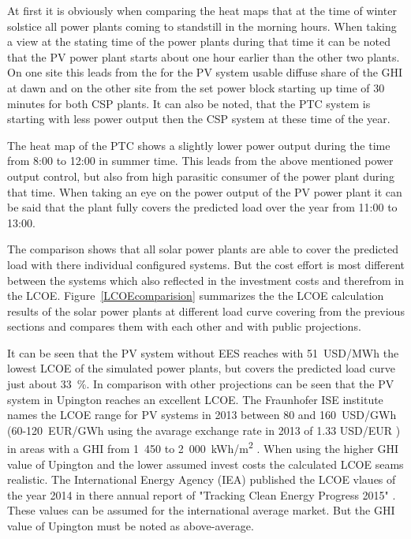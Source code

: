 At first it is obviously when comparing the heat maps that at the time of winter solstice all power plants coming to standstill in the morning hours. When taking a view at the stating time of the power plants during that time it can be noted that the PV power plant starts about one hour earlier than the other two plants. On one site this leads from the for the PV system usable diffuse share of the GHI at dawn and on the other site from the set power block starting up time of 30 minutes for both CSP plants. It can also be noted, that the PTC system is starting with less power output then the CSP system at these time of the year.

The heat map of the PTC shows a slightly lower power output during the time from 8:00 to 12:00 in summer time. This leads from the above mentioned power output control, but also from high parasitic consumer of the power plant during that time. When taking an eye on the power output of the PV power plant it can be said that the plant fully covers the predicted load over the year from 11:00 to 13:00.

The comparison shows that all solar power plants are able to cover the predicted load with there individual configured systems. But the cost effort is most different between the systems which also reflected in the investment costs and therefrom in the LCOE. Figure~\ref{LCOEcomparision} summarizes the the LCOE calculation results of the solar power plants at different load curve covering from the previous sections and compares them with each other and with public projections. 

It can be seen that the PV system without EES reaches with 51~USD/MWh the lowest LCOE of the simulated power plants, but covers the predicted load curve just about 33~\%. In comparison with other projections can be seen that the PV system in Upington reaches an excellent LCOE. The Fraunhofer ISE institute names the LCOE range for PV systems in 2013 between 80 and 160~USD/GWh (60-120~EUR/GWh using the avarage exchange rate in 2013 of 1.33 USD/EUR \cite{StatistaGmbH2015}) in areas with a GHI from 1~450 to 2~000~kWh/m\textsuperscript{2} \cite{FraunhoferISE2013}. When using the higher GHI value of Upington and the lower assumed invest costs the calculated LCOE seams realistic. The International Energy Agency (IEA) published the LCOE vlaues of the year 2014 in there annual report of "Tracking Clean Energy Progress 2015" \cite{IEA2015}. These values can be assumed for the international average market. But the GHI value of Upington must be noted as above-average.

